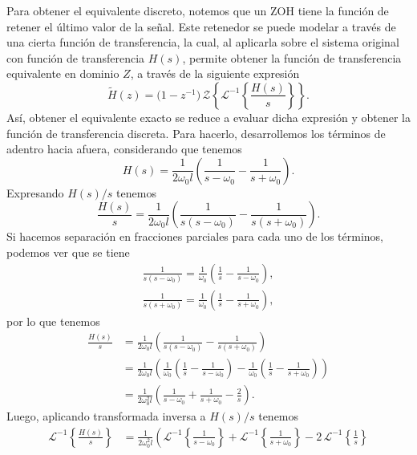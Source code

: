 \documentclass[
  11pt,
  letterpaper,
   addpoints,
  answers
  ]{exam}
\begin{document}
\begin{questions}
\begin{solution}
Para obtener el equivalente discreto, notemos que un ZOH tiene la función de retener el último valor de la señal. Este retenedor se puede modelar a través de una cierta función de transferencia, la cual, al aplicarla sobre el sistema original con función de transferencia $H(s)$, permite obtener la función de transferencia equivalente en dominio $Z$, a través de la siguiente expresión
\begin{equation}
\tilde{H}(z)=\big(1-z^{-1}\big)\,\mathcal{Z}\!\left\{\mathcal{L}^{-1}\!\left\{\frac{H(s)}{s}\right\}\right\}.
\end{equation}
Así, obtener el equivalente exacto se reduce a evaluar dicha expresión y obtener la función de transferencia discreta. Para hacerlo, desarrollemos los términos de adentro hacia afuera, considerando que tenemos
\begin{equation}
H(s)=\frac{1}{2\omega_0 l}\left(\frac{1}{s-\omega_0}-\frac{1}{s+\omega_0}\right).
\end{equation}
Expresando $H(s)/s$ tenemos
\begin{equation}
\frac{H(s)}{s}=\frac{1}{2\omega_0 l}
\left(\frac{1}{s(s-\omega_0)}-\frac{1}{s(s+\omega_0)}\right).
\end{equation}
Si hacemos separación en fracciones parciales para cada uno de los términos, podemos ver que se tiene
\begin{align}
\frac{1}{s(s-\omega_0)}=\frac{1}{\omega_0}\left(\frac{1}{s}-\frac{1}{s-\omega_0}\right),\\
\frac{1}{s(s+\omega_0)}=\frac{1}{\omega_0}\left(\frac{1}{s}-\frac{1}{s+\omega_0}\right),
\end{align}
por lo que tenemos
\begin{align}
\frac{H(s)}{s}
&=\frac{1}{2\omega_0 l}
\left(
\frac{1}{s(s-\omega_0)}-\frac{1}{s(s+\omega_0)}
\right)\\
&=\frac{1}{2\omega_0 l}
\left(
\frac{1}{\omega_0}\left(\frac{1}{s}-\frac{1}{s-\omega_0}\right)
-\frac{1}{\omega_0}\left(\frac{1}{s}-\frac{1}{s+\omega_0}\right)
\right)\\
&=\frac{1}{2\omega_0^{2} l}
\left(
\frac{1}{s-\omega_0}+\frac{1}{s+\omega_0}-\frac{2}{s}
\right).
\end{align}
Luego, aplicando transformada inversa a $H(s)/s$ tenemos
\begin{align}
\mathcal{L}^{-1}\!\left\{\frac{H(s)}{s}\right\}
&=\frac{1}{2\omega_0^{2} l}
\left(
\mathcal{L}^{-1}\!\left\{\frac{1}{s-\omega_0}\right\}
+\mathcal{L}^{-1}\!\left\{\frac{1}{s+\omega_0}\right\}
-2\,\mathcal{L}^{-1}\!\left\{\frac{1}{s}\right\}

\end{align}
\end{solution}
\end{questions}
\end{document}
